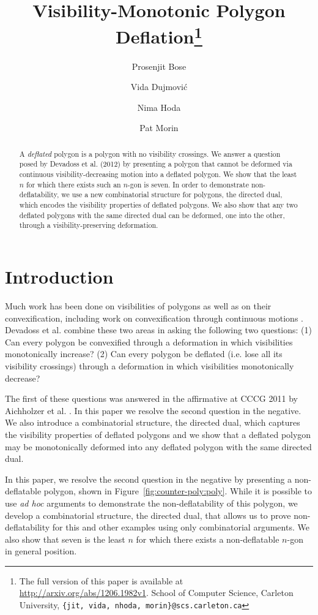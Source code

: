 \documentclass{patmorin}
\title{Visibility-Monotonic Polygon Deflation\thanks{\ifconferenceversion
    The full version of this paper is available
    at \protect\url{http://arxiv.org/abs/1206.1982v1}.  \fi School of
    Computer Science, Carleton University, {\tt \{jit, vida, nhoda,
    morin\}@scs.carleton.ca}}}
\author{Prosenjit Bose\and Vida Dujmovi{\'c}\and Nima Hoda\and Pat
  Morin}
\begin{document}
\ifconferenceversion
\thispagestyle{empty}
\fi

\maketitle

\begin{abstract}
  A \emph{deflated} polygon is a polygon with no visibility crossings.
  We answer a question posed by Devadoss et al. (2012) by presenting a
  polygon that cannot be deformed via continuous visibility-decreasing
  motion into a deflated polygon.  \iffullversion We show that the
  least $n$ for which there exists such an $n$-gon is seven.  \fi In
  order to demonstrate non-deflatability, we use a new combinatorial
  structure for polygons, the directed dual, which encodes the
  visibility properties of deflated polygons.  We also show that any
  two deflated polygons with the same directed dual can be deformed,
  one into the other, through a visibility-preserving deformation.
\end{abstract}

\section{Introduction}

Much work has been done on visibilities of polygons \cite{Ghosh07,
  ORourke87} as well as on their convexification, including work on
convexification through continuous motions \cite{Connely00}.  Devadoss
et al. \cite{Devadoss09} combine these two areas in asking the
following two questions: (1) Can every polygon be convexified through
a deformation in which visibilities monotonically increase?  (2) Can
every polygon be deflated (i.e. lose all its visibility crossings)
through a deformation in which visibilities monotonically decrease?

The first of these questions was answered in the affirmative at CCCG
2011 by Aichholzer et al. \cite{Aichholzer11b}.
%
\ifconferenceversion
%
In this paper we resolve the second question in the negative.  We also
introduce a combinatorial structure, the directed dual, which captures
the visibility properties of deflated polygons and we show that a
deflated polygon may be monotonically deformed into any deflated
polygon with the same directed dual.

\else %
%
In this paper, we resolve the second question in the negative by
presenting a non-deflatable polygon, shown in
Figure~\ref{fig:counter-poly:poly}.  While it is possible to use
\textit{ad hoc} arguments to demonstrate the non-deflatability of this
polygon, we develop a combinatorial structure, the directed dual, that
allows us to prove non-deflatability for this and other examples using
only combinatorial arguments.  We also show that seven is the least
$n$ for which there exists a non-deflatable $n$-gon in general
position.
\end{document}
